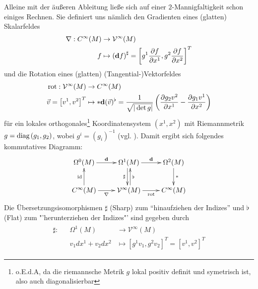   Alleine mit der äußeren Ableitung ließe sich auf einer \( 2 \)-Mannigfaltigkeit schon einiges Rechnen.
  Sie definiert uns nämlich den Gradienten eines (glatten) Skalarfeldes 
  \begin{align}
    \begin{aligned}
      \nabla: C^{\infty}(M) &\rightarrow \mathcal{V}^{\infty}(M) \\
                            f  &\mapsto \left( \mathbf{d} f \right)^{\sharp}
                                        = \left[ g^{1} \frac{\partial f}{\partial x^{1}}, g^{2} \frac{\partial f}{\partial x^{2}} \right]^{T}
    \end{aligned}
  \end{align}
  und die Rotation eines (glatten) (Tangential-)Vektorfeldes
  \begin{align}
    \begin{aligned}
      \text{rot}: \mathcal{V}^{\infty}(M) &\rightarrow C^{\infty}(M) \\
                \vec{v} = \left[ v^{1}, v^{2} \right]^{T} &\mapsto * \mathbf{d} (\vec{v})^{\flat}
                                                           = \frac{1}{\sqrt{|\det g|}}\left( \frac{\partial g_{2}v^{2}}{\partial x^{1}} -  \frac{\partial g_{1}v^{1}}{\partial x^{2}}\right)
    \end{aligned}
  \end{align}
  für ein lokales orthogonales\footnote{o.E.d.A, da die riemannsche Metrik \( g  \) lokal positiv definit und symetrisch ist, also auch diagonalisierbar} 
  Koordinatensystem \( (x^{1}, x^{2}) \) mit Riemannmetrik \( g = \text{diag}\left( g_{1},g_{2} \right) \), wobei \( g^{i}=(g_{i})^{-1} \) (vgl. \cite{nitschke}). 
  Damit ergibt sich folgendes kommutatives Diagramm:
  \begin{align}
    \label{diag2DimAusAbleitung}
    \begin{xy} \xymatrix{
      \Omega^{0}(M) \ar[r]^{\exd} & \Omega^{1}(M) \ar[r]^{\exd} \ar@<-2pt>[d]_{\sharp} & \Omega^{2}(M) \ar[d]^{*}\\
      C^{\infty}(M) \ar[r]_{\nabla} \ar[u]^{\text{id}} & \mathcal{V}^{\infty}(M) \ar[r]_{\text{rot}} \ar@<-2pt>[u]_{\flat} & C^{\infty}(M) }
    \end{xy}
  \end{align}
  Die Übersetzungsisomorphismen \( \sharp \) (Sharp) zum "`hinaufziehen der Indizes"' und \( \flat \) (Flat) zum "'herunterziehen der Indizes"' sind gegeben durch
  \begin{align}
    \begin{aligned}
      \sharp:&& \Omega^{1}(M) &\rightarrow \mathcal{V}^{\infty}(M) \\
            &&   v_{1} dx^{1} + v_{2} dx^{2} &\mapsto \left[ g^{1}v_{1}, g^{2}v_{2} \right]^{T} = \left[ v^{1}, v^{2} \right]^{T}
    \end{aligned}
  \end{align}
